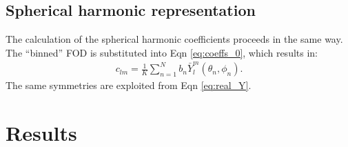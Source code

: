 \documentclass{article}
\begin{document}
\subsection{Spherical harmonic representation}
The calculation of the spherical harmonic coefficients proceeds in the same way. The
``binned'' FOD is substituted into Eqn \ref{eq:coeffs_0}, which results in:
\begin{align}
  c_{lm} = \frac{1}{K}\sum_{n=1}^N b_n \bar{Y}_l^m(\theta_n, \phi_n).
  \label{eq:4}
\end{align}
The same symmetries are exploited from Eqn \ref{eq:real_Y}.

\section{Results}
\end{document}

